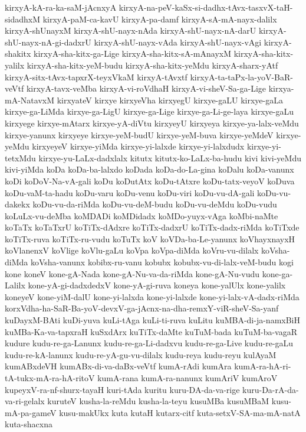 {kirxyA-kA-ra-ka-saM-jAcnxyA
kirxyA-na-peV-kaSx-si-dadhx-tAvx-tasxvX-taH-sidadhxM
kirxyA-paM-ca-kavU
kirxyA-pa-damf
kirxyA-sA-mA-nayx-dalilx
kirxyA-shUnayxM
kirxyA-shU-nayx-nAda
kirxyA-shU-nayx-nA-darU
kirxyA-shU-nayx-nA-gi-dadxrU
kirxyA-shU-nayx-vAda
kirxyA-shU-nayx-vAgi
kirxyA-shakitx
kirxyA-sha-kitx-ga-Lige
kirxyA-sha-kitx-sA-mAnayxM
kirxyA-sha-kitx-yalilx
kirxyA-sha-kitx-yeM-budu
kirxyA-sha-kitx-yeMdu
kirxyA-sharx-yAtf
kirxyA-sitx-tAvx-tapxrX-teyxVkaM
kirxyA-tAvxtf
kirxyA-ta-taPx-la-yoV-BaR-veVtf
kirxyA-tavx-veMba
kirxyA-vi-roVdhaH
kirxyA-vi-sheV-Sa-ga-Lige
kirxya-mA-NatavxM
kirxyateV
kirxye
kirxyeVha
kirxyegU
kirxye-gaLU
kirxye-gaLa
kirxye-ga-LiMda
kirxye-ga-LigU
kirxye-ga-Lige
kirxye-ga-Li-ge-laya
kirxye-gaLu
kirxyege
kirxye-mAtarx
kirxye-yA-diVtu
kirxyeyU
kirxyeya
kirxye-ya-lalx-veMdu
kirxye-yanunx
kirxyeye
kirxye-yeM-budU
kirxye-yeM-buva
kirxye-yeMdeV
kirxye-yeMdu
kirxyeyeV
kirxye-yiMda
kirxye-yi-lalxde
kirxye-yi-lalxdudx
kirxye-yi-tetxMdu
kirxye-yu-LaLx-dadxlalx
kitutx
kitutx-ko-LaLx-ba-hudu
kivi
kivi-yeMdu
kivi-yiMda
koDa
koDa-ba-lalxdo
koDada
koDa-do-La-gina
koDalu
koDa-vanunx
koDi
koDoV-Na-vA-gali
koDu
koDutAtx
koDu-tAtxre
koDu-tatx-veyoV
koDuva
koDu-vaM-ta-hadu
koDu-varu
koDu-venu
koDu-viri
koDu-vu-dA-gali
koDu-vu-dakekx
koDu-vu-da-riMda
koDu-vu-deM-budu
koDu-vu-deMdu
koDu-vudu
koLuLx-vu-deMba
koMDADi
koMDidadx
koMDo-yuyx-vAga
koMbi-naMte
koTaTx
koTaTxrU
koTiTx-dAdxre
koTiTx-dadxrU
koTiTx-dadx-riMda
koTiTxde
koTiTx-ruva
koTiTx-ru-vudu
koTuTx
koV
koVDa-ba-Le-yanunx
koVhayxnayxH
koVlanenxV
koVlige
koVlu-gaLu
koVpa
koVpa-diMda
koVru-vu-dilalx
koVsha-diMda
koVsha-vanunx
kobibx-ru-vanu
kobubx
kobubx-vu-di-lalx-veM-budu
kogi
kone
koneV
kone-gA-Nada
kone-gA-Nu-va-da-riMda
kone-gA-Nu-vudu
kone-ga-Lalilx
kone-yA-gi-dadxdedxV
kone-yA-gi-ruva
koneya
kone-yalUlx
kone-yalilx
koneyeV
kone-yiM-dalU
kone-yi-lalxda
kone-yi-lalxde
kone-yi-lalx-vA-dadx-riMda
korxVdha-ha-SaR-Ba-yoV-devxV-ga-jAcnx-na-dha-remxY-viR-sheV-Sa-yanf
kuDayxM-BAti
kuDi-yuva
kuLi-tAga
kuLi-ti-ruva
kuLitu
kuMBA-di-ja-namxBiH
kuMBa-Ka-va-tapxraH
kuSxdArx
kuTiTx-daMte
kuTuM-bada
kuTuM-ba-vagaR
kudure
kudu-re-ga-Lanunx
kudu-re-ga-Li-dadxvu
kudu-re-ga-Live
kudu-re-gaLu
kudu-re-kA-lanunx
kudu-re-yA-gu-vu-dilalx
kudu-reya
kudu-reyu
kulAyaM
kumABxdeVH
kumABx-di-va-daBx-veVtf
kumA-rAdi
kumAra
kumA-ra-hA-ri-tA-tukx-mA-ra-hA-ritoV
kumA-rana
kumA-ra-nanunx
kumAriV
kumAroV
kupeyxV-ra-nf-shurx-tayaH
kuri-tAda
kuritu
kuru-DA-da-va-rige
kuru-Da-rA-da-va-ri-gelalx
kuruteV
kusha-la-reMdu
kusha-la-teyu
kusuMBa
kusuMBaM
kusu-mA-pa-gameV
kusu-makUkx
kuta
kutaH
kutarx-citf
kuta-setxV-SA-ma-mA-natA
kuta-shacxna
}

